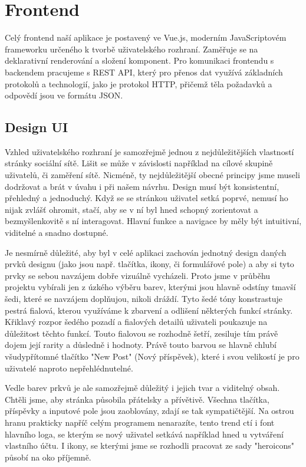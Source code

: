 \section{Frontend}

Celý frontend naší aplikace je postavený ve Vue.js, moderním
JavaScriptovém frameworku určeného k tvorbě uživatelského rozhraní.
Zaměřuje se na deklarativní renderování a složení komponent.
Pro komunikaci frontendu s backendem pracujeme s REST API, který
pro přenos dat využívá základních protokolů a technologií, jako je
protokol HTTP, přičemž těla požadavků a odpovědí jsou ve formátu JSON.

\subsection{Design UI}

Vzhled uživatelského rozhraní je samozřejmě jednou z nejdůležitějších
vlastností stránky sociální sítě. Lišit se může v závislosti například
na cílové skupině uživatelů, či zaměření sítě. Nicméně, ty nejdůležitější 
obecné principy jsme museli dodržovat a brát v úvahu i při našem návrhu.
Design musí být konsistentní, přehledný a jednoduchý. Když se se stránkou
uživatel setká poprvé, nemusí ho nijak zvlášť ohromit, stačí, aby se v ní
byl hned schopný zorientovat a bezmyšlenkovitě s ní interagovat. Hlavní
funkce a navigace by měly být intuitivní, viditelné a snadno dostupné. 

Je nesmírně důležité, aby byl v celé aplikaci zachován jednotný design 
daných prvků designu (jako jsou např. tlačítka, ikony, či formulářové pole)
a aby si tyto prvky se sebou navzájem dobře vizuálně vycházeli. Proto jsme
v průběhu projektu vybírali jen z úzkého výběru barev, kterými jsou hlavně 
odstíny tmavší šedi, které se navzájem doplňujou, nikoli dráždí. Tyto šedé
tóny konstrastuje pestrá fialová, kterou využíváme k zbarvení a odlišení 
některých funkcí stránky. Křiklavý rozpor šedého pozadí a fialových
detailů uživateli poukazuje na důležitost těchto funkcí. Touto fialovou se
rozhodně šetří, zesiluje tím právě dojem její rarity a důsledně i hodnoty.
Právě touto barvou se hlavně chlubí všudypřítomné tlačítko "New Post" 
(Nový příspěvek), které i svou velikostí je pro uživatelé naproto
nepřehlédnutelné.

Vedle barev prkvů je ale samozřejmě důležitý i jejich tvar a viditelný obsah.
Chtěli jsme, aby stránka působila přátelsky a přívětivě. Všechna tlačítka,
příspěvky a inputové pole jsou zaoblovány, zdají se tak sympatičtější. Na 
ostrou hranu prakticky napříč celým programem nenarazíte, tento trend ctí
i font hlavního loga, se kterým se nový uživatel setkává například hned u
vytváření vlastního účtu. I ikony, se kterými jsme se rozhodli pracovat ze
sady "heroicons" působí na oko příjemně.

